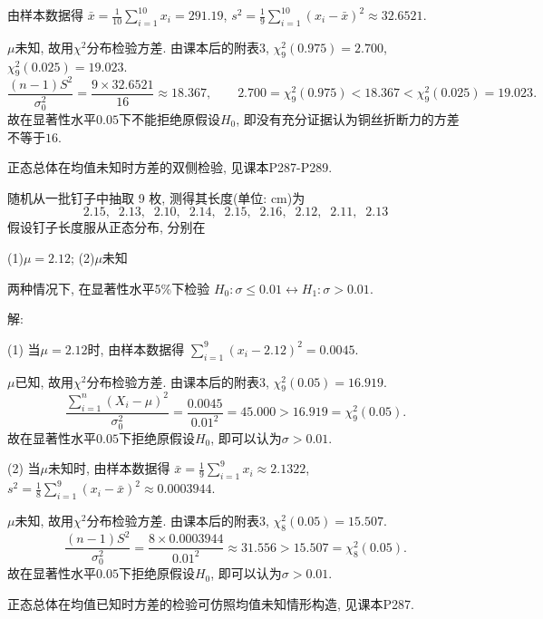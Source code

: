 \documentclass[standard]{ExBook}
\renewenvironment{shaded}{%
  \def\FrameCommand{\fboxsep=\FrameSep \colorbox{shadecolor}}%
  \MakeFramed{\advance\hsize-\width \FrameRestore}%
}{%
  \endMakeFramed
}
\begin{document}
\begin{qitems}
由样本数据得
$
\bar{x}
=\frac{1}{10}\sum_{i=1}^{10}x_i
=291.19$,
$
s^2
=\frac{1}{9}\sum_{i=1}^{10}(x_i-\bar{x})^2
\approx32.6521
$.

$\mu$未知, 故用$\chi^2$分布检验方差. 由课本后的附表3, $\chi_9^2(0.975)=2.700$, $\chi_9^2(0.025)=19.023$.
$$
\frac{(n-1)S^2}{\sigma_0^2}
=
\frac{9\times32.6521}{16}
\approx18.367,
\qquad
2.700
=
\chi_9^2(0.975)
<
18.367
<
\chi_9^2(0.025)
=
19.023.
$$
故在显著性水平$0.05$下不能拒绝原假设$H_0$, 即没有充分证据认为铜丝折断力的方差不等于$16$.

\textcolor{themeColor}{\selectfont {} 正态总体在均值未知时方差的双侧检验, 见课本P287-P289.}

\vspace{2.5cm-5em}

    \begin{bbox}
    \begin{shaded}
        \qitem
随机从一批钉子中抽取 9 枚, 测得其长度(单位: cm)为
$$2.15, \;\; 2.13, \;\; 2.10, \;\; 2.14, \;\; 2.15, \;\; 2.16, \;\; 2.12, \;\; 2.11, \;\; 2.13$$
假设钉子长度服从正态分布, 分别在

(1)$\mu=2.12$; \qquad (2)$\mu$未知

两种情况下, 在显著性水平5\%下检验 $H_0 : \sigma\leq 0.01 \longleftrightarrow H_1 : \sigma>0.01$.
    \end{shaded}
    \end{bbox}

\vspace{\dimexpr2.5cm-5em\relax}

解:

(1) 当$\mu=2.12$时, 由样本数据得
$
\displaystyle\sum_{i=1}^{9}(x_i-2.12)^2=0.0045
$.

$\mu$已知, 故用$\chi^2$分布检验方差. 由课本后的附表3, $\chi_9^2(0.05)=16.919$.
$$
\frac{\sum\limits_{i=1}^{n}(X_i-\mu)^2}{\sigma_0^2}
=
\frac{0.0045}{0.01^2}
=
45.000
>
16.919
=
\chi_9^2(0.05).
$$
故在显著性水平$0.05$下拒绝原假设$H_0$, 即可以认为$\sigma>0.01$.

(2) 当$\mu$未知时, 由样本数据得
$
\bar{x}
=\frac{1}{9}\sum_{i=1}^{9}x_i
\approx2.1322
$,
$
s^2
=\frac{1}{8}\sum_{i=1}^{9}(x_i-\bar{x})^2
\approx0.0003944
$.

$\mu$未知, 故用$\chi^2$分布检验方差. 由课本后的附表3, $\chi_8^2(0.05)=15.507$.
$$
\frac{(n-1)S^2}{\sigma_0^2}
=
\frac{8\times0.0003944}{0.01^2}
\approx31.556
>
15.507
=
\chi_8^2(0.05).
$$
故在显著性水平$0.05$下拒绝原假设$H_0$, 即可以认为$\sigma>0.01$.

\textcolor{themeColor}{\selectfont {} 正态总体在均值已知时方差的检验可仿照均值未知情形构造, 见课本P287.}


\end{qitems}
\end{document}
